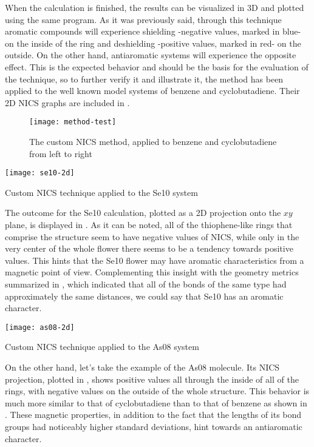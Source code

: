 When the calculation is finished, the results can be visualized in 3D and plotted using the same program.
As it was previously said, through this technique aromatic compounds will experience shielding -negative values, marked in blue- on the inside of the ring and deshielding -positive values, marked in red- on the outside.
On the other hand, antiaromatic systems will experience the opposite effect.
This is the expected behavior and should be the basis for the evaluation of the technique, so to further verify it and illustrate it, the method has been applied to the well known model systems of benzene and cyclobutadiene.
Their 2D NICS graphs are included in .

\begin{figure}[h]
    \texttt{[image: method-test]}
    \caption[NICS applied to test systems]{The custom NICS method, applied to benzene and cyclobutadiene from left to right}
\end{figure}

\begin{marginfigure}
    \texttt{[image: se10-2d]}
    \caption[NICS applied to Se10]{Custom NICS technique applied to the Se10 system}
\end{marginfigure}

The outcome for the Se10 calculation, plotted as a 2D projection onto the $xy$ plane, is displayed in .
As it can be noted, all of the thiophene-like rings that comprise the structure seem to have negative values of NICS, while only in the very center of the whole flower there seems to be a tendency towards positive values.
This hints that the Se10 flower may have aromatic characteristics from a magnetic point of view.
Complementing this insight with the geometry metrics summarized in , which indicated that all of the bonds of the same type had approximately the same distances, we could say that Se10 has an aromatic character.

\begin{marginfigure}
    \texttt{[image: as08-2d]}
    \caption[NICS applied to As08]{Custom NICS technique applied to the As08 system}
\end{marginfigure}

On the other hand, let's take the example of the As08 molecule.
Its NICS projection, plotted in , shows positive values all through the inside of all of the rings, with negative values on the outside of the whole structure.
This behavior is much more similar to that of cyclobutadiene than to that of benzene as shown in .
These magnetic properties, in addition to the fact that the lengths of its bond groups had noticeably higher standard deviations, hint towards an antiaromatic character.


